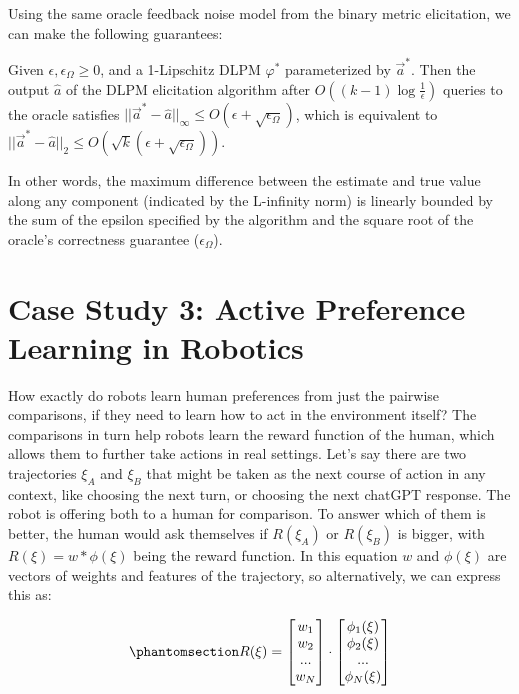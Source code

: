 \documentclass[
  letterpaper,
  numbers=noenddot,
  DIV=11]{scrreprt}
\theoremstyle{plain}
\theoremstyle{definition}
\theoremstyle{remark}
\begin{document}
Using the same oracle feedback noise model from the binary metric
elicitation, we can make the following guarantees:

\begin{tcolorbox}[colframe=.grey, title=\faPenSquare \enspace Proposition]

\label{prop-prop_dlpm}
Given \(\epsilon, \epsilon_\Omega \geq 0\), and a 1-Lipschitz DLPM
\(\varphi^*\) parameterized by \(\vec{a}^*\). Then the output
\(\hat{a}\) of the DLPM elicitation algorithm after
\(O((k-1)\log\frac{1}{\epsilon})\) queries to the oracle satisfies
\(||\vec{a}^* - \hat{a}||_\infty \leq O(\epsilon + \sqrt{\epsilon_\Omega})\),
which is equivalent to
\(||\vec{a}^* - \hat{a}||_2 \leq O(\sqrt{k}(\epsilon + \sqrt{\epsilon_\Omega}))\).

\end{tcolorbox}

In other words, the maximum difference between the estimate and true
value along any component (indicated by the L-infinity norm) is linearly
bounded by the sum of the epsilon specified by the algorithm and the
square root of the oracle's correctness guarantee (\(\epsilon_\Omega\)).

\section{Case Study 3: Active Preference Learning in
Robotics}\label{case-study-3-active-preference-learning-in-robotics}

How exactly do robots learn human preferences from just the pairwise
comparisons, if they need to learn how to act in the environment itself?
The comparisons in turn help robots learn the reward function of the
human, which allows them to further take actions in real settings. Let's
say there are two trajectories \(\xi_A\) and \(\xi_B\) that might be
taken as the next course of action in any context, like choosing the
next turn, or choosing the next chatGPT response. The robot is offering
both to a human for comparison. To answer which of them is better, the
human would ask themselves if \(R(\xi_A)\) or \(R(\xi_B)\) is bigger,
with \(R(\xi) = w * \phi(\xi)\) being the reward function. In this
equation \(w\) and \(\phi(\xi)\) are vectors of weights and features of
the trajectory, so alternatively, we can express this as:

\begin{equation}\phantomsection\label{eq-reward_eq}{R(\xi) = \begin{bmatrix} w_1 \\ w_2 \\ ... \\ w_N \end{bmatrix} \cdot \begin{bmatrix} \phi_1(\xi) \\ \phi_2(\xi) \\ ... \\ \phi_N(\xi) \end{bmatrix}}\end{equation}
\end{document}
